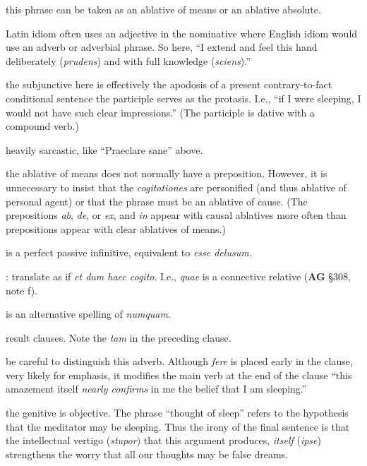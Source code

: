  this phrase can be taken as an ablative of means or an ablative absolute.

 Latin idiom often uses an adjective in the nominative where English idiom would use an adverb or adverbial phrase. So here, ``I extend and feel this hand deliberately (\textit{prudens}) and with full knowledge (\textit{sciens}).''

 the subjunctive here is effectively the apodosis of a present contrary-to-fact conditional sentence the participle serves as the protasis. I.e., ``if I were sleeping, I would not have such clear impressions.'' (The participle is dative with a compound verb.) 

 heavily sarcastic, like ``Praeclare sane'' above.

 the ablative of means does not normally have a preposition. However, it is unnecessary to insist that the \textit{cogitationes} are personified (and thus ablative of personal agent) or that the phrase must be an ablative of cause. (The prepositions \textit{ab}, \textit{de}, or \textit{ex}, and \textit{in} appear with causal ablatives more often than prepositions appear with clear ablatives of means.)

 is a perfect passive infinitive, equivalent to \textit{esse delusum}.

: translate as if \textit{et dum haec cogito}. I.e., \textit{quae} is a connective relative (\textbf{AG} §308, note f).

 is an alternative spelling of \textit{numquam}.

 result clauses. Note the \textit{tam} in the preceding clause.

 be careful to distinguish this adverb. Although \textit{fere} is placed early in the clause, very likely for emphasis, it modifies the main verb at the end of the clause ``this amazement itself \textit{nearly confirms} in me the belief that I am sleeping.''

 the genitive is objective. The phrase ``thought of sleep'' refers to the hypothesis that the meditator may be sleeping. Thus the irony of the final sentence is that the intellectual vertigo (\textit{stupor}) that this argument produces, \textit{itself} (\textit{ipse}) strengthens the worry that all our thoughts may be false dreams.


